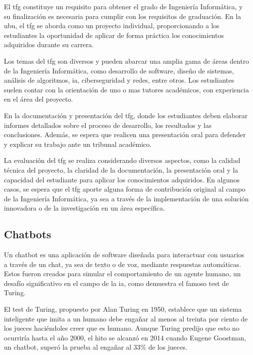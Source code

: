 
El \acrfull{tfg} constituye un requisito para obtener el grado de Ingeniería Informática, y su finalización es necesaria para cumplir con los requisitos de graduación. En la \acrfull{ubu}, el \acrshort{tfg} se aborda como un proyecto individual, proporcionando a los estudiantes la oportunidad de aplicar de forma práctica los conocimientos adquiridos durante su carrera.

Los temas del \acrshort{tfg} son diversos y pueden abarcar una amplia gama de áreas dentro de la Ingeniería Informática, como desarrollo de software, diseño de sistemas, análisis de algoritmos, \acrlong{ia}, ciberseguridad y redes, entre otros. Los estudiantes suelen contar con la orientación de uno o mas tutores académicos, con experiencia en el área del proyecto.

En la documentación y presentación del \acrshort{tfg}, donde los estudiantes deben elaborar informes detallados sobre el proceso de desarrollo, los resultados y las conclusiones. Además, se espera que realicen una presentación oral para defender y explicar su trabajo ante un tribunal académico.

La evaluación del \acrshort{tfg} se realiza considerando diversos aspectos, como la calidad técnica del proyecto, la claridad de la documentación, la presentación oral y la capacidad del estudiante para aplicar los conocimientos adquiridos. En algunos casos, se espera que el \acrshort{tfg} aporte alguna forma de contribución original al campo de la Ingeniería Informática, ya sea a través de la implementación de una solución innovadora o de la investigación en un área específica.

\subsection{Chatbots}

Un chatbot es una aplicación de software diseñada para interactuar con usuarios a través de un chat, ya sea de texto o de voz, mediante respuestas automáticas. Estos fueron creados para simular el comportamiento de un agente humano, un desafío significativo en el campo de la \acrlong{ia}, como demuestra el famoso test de Turing.

El test de Turing, propuesto por Alan Turing en 1950, establece que un sistema inteligente que imita a un humano debe engañar al menos al treinta por ciento de los jueces haciéndoles creer que es humano. Aunque Turing predijo que esto no ocurriría hasta el año 2000, el hito se alcanzó en 2014 cuando Eugene Goostman, un chatbot, superó la prueba al engañar al 33\% de los jueces.

